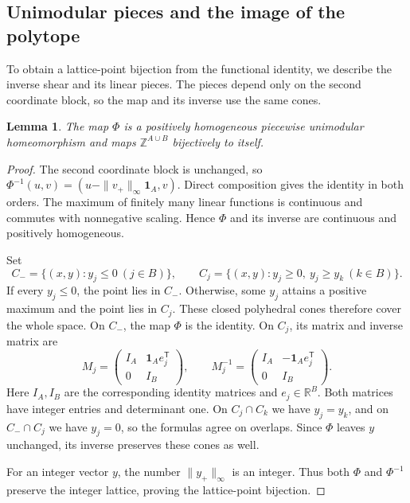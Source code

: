\documentclass[11pt,reqno]{amsart}
\numberwithin{equation}{section}
\newtheorem{lemma}[theorem]{Lemma}
\theoremstyle{definition}
\theoremstyle{remark}
\theoremstyle{definition}
\begin{document}
\subsection{Unimodular pieces and the image of the polytope}
To obtain a lattice-point bijection from the functional identity, we describe the inverse shear and its linear pieces. The pieces depend only on the second coordinate block, so the map and its inverse use the same cones.

\begin{lemma}\label{pl}
The map $\Phi$ is a positively homogeneous piecewise unimodular homeomorphism and maps $\mathbb Z^{A\cup B}$ bijectively to itself.
\end{lemma}
\begin{proof}
The second coordinate block is unchanged, so
$\Phi^{-1}(u,v)=(u-\|v_+\|_\infty\mathbf1_A,v)$.
Direct composition gives the identity in both orders. The maximum of finitely many linear functions is continuous and commutes with nonnegative scaling. Hence $\Phi$ and its inverse are continuous and positively homogeneous.

Set
\[
 C_-=\{(x,y):y_j\le0\ (j\in B)\},\qquad
 C_j=\{(x,y):y_j\ge0,\ y_j\ge y_k\ (k\in B)\}.
\]
If every $y_j\le0$, the point lies in $C_-$. Otherwise, some $y_j$ attains a positive maximum and the point lies in $C_j$. These closed polyhedral cones therefore cover the whole space. On $C_-$, the map $\Phi$ is the identity. On $C_j$, its matrix and inverse matrix are
\[
 M_j=\begin{pmatrix}I_A&\mathbf1_Ae_j^{\mathsf T}\\0&I_B\end{pmatrix},
 \qquad
 M_j^{-1}=\begin{pmatrix}I_A&-\mathbf1_Ae_j^{\mathsf T}\\0&I_B\end{pmatrix}.
\]
Here $I_A,I_B$ are the corresponding identity matrices and $e_j\in\mathbb R^B$. Both matrices have integer entries and determinant one. On $C_j\cap C_k$ we have $y_j=y_k$, and on $C_-\cap C_j$ we have $y_j=0$, so the formulas agree on overlaps. Since $\Phi$ leaves $y$ unchanged, its inverse preserves these cones as well.

For an integer vector $y$, the number $\|y_+\|_\infty$ is an integer. Thus both $\Phi$ and $\Phi^{-1}$ preserve the integer lattice, proving the lattice-point bijection.
\end{proof}
\end{document}

